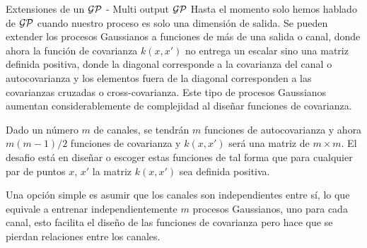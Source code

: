 \documentclass[handout, 9pt]{beamer}
\begin{document}
\begin{frame}{Extensiones de un $\mathcal{GP}$ - Multi output $\mathcal{GP}$}
    Hasta el momento solo hemos hablado de $\mathcal{GP}$ cuando nuestro proceso es solo una dimensión de salida. Se pueden extender los procesos Gaussianos a funciones de más de una salida o canal, donde ahora la función de covarianza $k(x, x')$ no entrega un escalar sino una matriz definida positiva, donde la diagonal corresponde a la covarianza del canal o autocovarianza y los elementos fuera de la diagonal corresponden a las covarianzas cruzadas o cross-covarianza. Este tipo de procesos Gaussianos aumentan considerablemente de complejidad al diseñar funciones de covarianza.

    \vspace{0.2cm} \pause

    Dado un número $m$ de canales, se tendrán $m$ funciones de autocovarianza y ahora $m(m-1)/2$ funciones de covarianza y $k(x, x')$ será una matriz de $m\times m$. El desafio está en diseñar o escoger estas funciones de tal forma que para cualquier par de puntos $x$, $x'$ la matriz $k(x, x')$ sea definida positiva.

    \vspace{0.2cm} \pause

    Una opción simple es asumir que los canales son independientes entre sí, lo que equivale a entrenar independientemente $m$ procesos Gaussianos, uno para cada canal, esto facilita el diseño de las funciones de covarianza pero hace que se pierdan relaciones entre los canales.
 



    
\end{frame}




\begin{frame}
  \titlepage
\end{frame}




%
\end{document}
